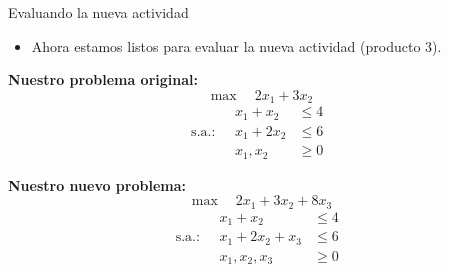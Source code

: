 \documentclass{beamer}
\begin{document}
\begin{frame}{Evaluando la nueva actividad}
    \begin{itemize}
        \item Ahora estamos listos para evaluar la nueva actividad (producto 3).
    \end{itemize}

    \vspace{0.3cm}

    \textbf{Nuestro problema original:}
    \[
    \max \quad 2x_1 + 3x_2
    \]
    \[
    \text{s.a.:} \quad 
    \begin{aligned}
    x_1 + x_2 &\leq 4 \\
    x_1 + 2x_2 &\leq 6 \\
    x_1, x_2 &\geq 0
    \end{aligned}
    \]

    \textbf{Nuestro nuevo problema:}
    \[
    \max \quad 2x_1 + 3x_2 + 8x_3
    \]
    \[
    \text{s.a.:} \quad 
    \begin{aligned}
    x_1 + x_2 &\leq 4 \\
    x_1 + 2x_2 + x_3 &\leq 6 \\
    x_1, x_2, x_3 &\geq 0
    \end{aligned}
    \]
\end{frame}
\end{document}
